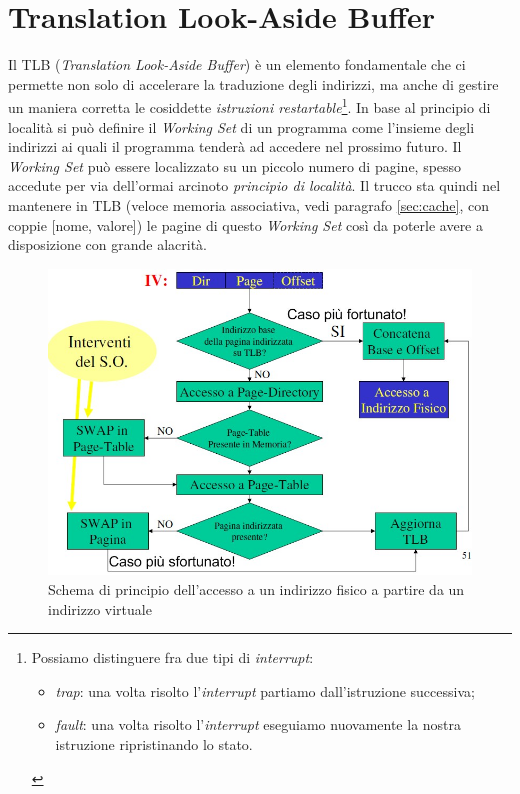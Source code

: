 \section{Translation Look-Aside Buffer}
\label{sec:TLB}

Il TLB (\textit{Translation Look-Aside Buffer}) è un elemento fondamentale che ci permette non solo di accelerare la traduzione degli indirizzi, ma anche di gestire un maniera corretta le cosiddette \textit{istruzioni restartable}\footnote{Possiamo distinguere fra due tipi di \textit{interrupt}:
\begin{itemize}
\item \textit{trap}: una volta risolto l'\textit{interrupt} partiamo dall'istruzione successiva;
\item \textit{fault}: una volta risolto l'\textit{interrupt} eseguiamo nuovamente la nostra istruzione ripristinando lo stato.
\end{itemize}
}.
In base al principio di località si può definire il \textit{Working Set} di un programma come l'insieme degli indirizzi ai quali il programma tenderà ad accedere nel prossimo futuro. Il \textit{Working Set} può essere localizzato su un piccolo numero di pagine, spesso accedute per via dell'ormai arcinoto \textit{principio di località}. Il trucco sta quindi nel mantenere in TLB (veloce memoria associativa, vedi paragrafo \ref{sec:cache}, con coppie [nome, valore]) le pagine di questo \textit{Working Set} così da poterle avere a disposizione con grande alacrità.

\begin{figure}[!h]
\centering
\includegraphics[width=0.9\columnwidth]{img/percorsoTLB}
\caption{Schema di principio dell'accesso a un indirizzo fisico a partire da un indirizzo virtuale}
\label{fig:percorsoTLB}
\end{figure}

